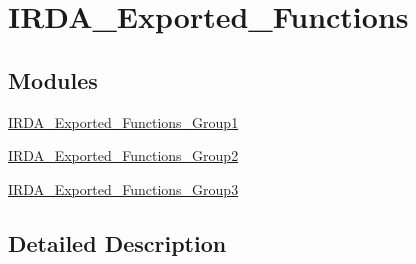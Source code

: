 \hypertarget{group___i_r_d_a___exported___functions}{}\section{I\+R\+D\+A\+\_\+\+Exported\+\_\+\+Functions}
\label{group___i_r_d_a___exported___functions}
\subsection*{Modules}
\begin{DoxyCompactItemize}
\item 
\hyperlink{group___i_r_d_a___exported___functions___group1}{I\+R\+D\+A\+\_\+\+Exported\+\_\+\+Functions\+\_\+\+Group1}
\item 
\hyperlink{group___i_r_d_a___exported___functions___group2}{I\+R\+D\+A\+\_\+\+Exported\+\_\+\+Functions\+\_\+\+Group2}
\item 
\hyperlink{group___i_r_d_a___exported___functions___group3}{I\+R\+D\+A\+\_\+\+Exported\+\_\+\+Functions\+\_\+\+Group3}
\end{DoxyCompactItemize}


\subsection{Detailed Description}
